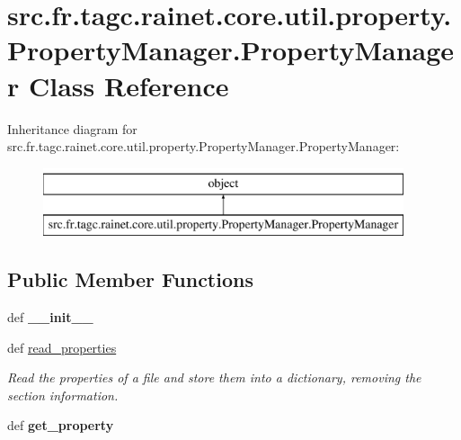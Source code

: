 \hypertarget{classsrc_1_1fr_1_1tagc_1_1rainet_1_1core_1_1util_1_1property_1_1PropertyManager_1_1PropertyManager}{\section{src.\-fr.\-tagc.\-rainet.\-core.\-util.\-property.\-Property\-Manager.\-Property\-Manager Class Reference}
\label{classsrc_1_1fr_1_1tagc_1_1rainet_1_1core_1_1util_1_1property_1_1PropertyManager_1_1PropertyManager}
}
Inheritance diagram for src.\-fr.\-tagc.\-rainet.\-core.\-util.\-property.\-Property\-Manager.\-Property\-Manager\-:\begin{figure}[H]
\begin{center}
\leavevmode
\includegraphics[height=2.000000cm]{classsrc_1_1fr_1_1tagc_1_1rainet_1_1core_1_1util_1_1property_1_1PropertyManager_1_1PropertyManager}
\end{center}
\end{figure}
\subsection*{Public Member Functions}
\begin{DoxyCompactItemize}
\item 
\hypertarget{classsrc_1_1fr_1_1tagc_1_1rainet_1_1core_1_1util_1_1property_1_1PropertyManager_1_1PropertyManager_af5a3d731e35400542c9585d6ea0cfb85}{def {\bfseries \-\_\-\-\_\-init\-\_\-\-\_\-}}\label{classsrc_1_1fr_1_1tagc_1_1rainet_1_1core_1_1util_1_1property_1_1PropertyManager_1_1PropertyManager_af5a3d731e35400542c9585d6ea0cfb85}

\item 
def \hyperlink{classsrc_1_1fr_1_1tagc_1_1rainet_1_1core_1_1util_1_1property_1_1PropertyManager_1_1PropertyManager_a6e7479851532f2a29dbaedefc97a0c54}{read\-\_\-properties}
\begin{DoxyCompactList}\small\item\em Read the properties of a file and store them into a dictionary, removing the section information. \end{DoxyCompactList}\item 
\hypertarget{classsrc_1_1fr_1_1tagc_1_1rainet_1_1core_1_1util_1_1property_1_1PropertyManager_1_1PropertyManager_a2026c83fac527198a1ba0fb19bbda74d}{def {\bfseries get\-\_\-property}}\label{classsrc_1_1fr_1_1tagc_1_1rainet_1_1core_1_1util_1_1property_1_1PropertyManager_1_1PropertyManager_a2026c83fac527198a1ba0fb19bbda74d}

\end{DoxyCompactItemize}
